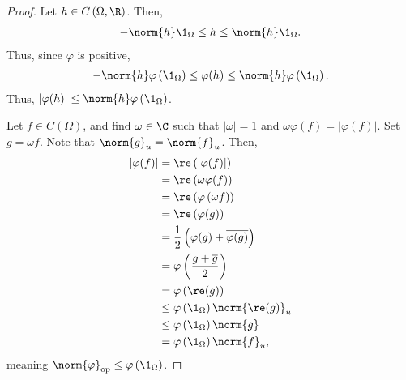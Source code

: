 \documentclass[10pt]{mypackage}
\begin{document}
\begin{proof}
  Let $h\in C\left(\Omega,\R\right)$. Then,
  \begin{align*}
    -\norm{h}\1_{\Omega}\leq h \leq \norm{h}\1_{\Omega}.
  \end{align*}
  Thus, since $\varphi$ is positive,
  \begin{align*}
    -\norm{h}\varphi\left(\1_{\Omega}\right) \leq \varphi(h) \leq \norm{h}\varphi\left(\1_{\Omega}\right).
  \end{align*}
  Thus, $\left\vert \varphi(h) \right\vert\leq \norm{h}\varphi\left(\1_{\Omega}\right)$.\newline

  Let $f\in C\left(\Omega\right)$, and find $\omega\in \C$ such that $\left\vert \omega \right\vert = 1$ and $\omega\varphi(f) = \left\vert \varphi(f) \right\vert$. Set $g = \omega f$. Note that $\norm{g}_{u} = \norm{f}_u$. Then,
  \begin{align*}
    \left\vert \varphi(f) \right\vert &= \re\left(\left\vert \varphi(f) \right\vert\right)\\
                                      &= \re\left(\omega\varphi(f)\right)\\
                                      &= \re\left(\varphi\left(\omega f\right)\right)\\
                                      &= \re\left(\varphi(g)\right)\\
                                      &= \frac{1}{2}\left(\varphi(g) + \overline{\varphi(g)}\right)\\
                                      &= \varphi\left(\frac{g + \overline{g}}{2}\right)\\
                                      &= \varphi\left(\re(g)\right)\\
                                      &\leq \varphi\left(\1_\Omega\right)\norm{\re(g)}_{u}\\
                                      &\leq \varphi\left(\1_\Omega\right)\norm{g}\\
                                      &= \varphi\left(\1_{\Omega}\right)\norm{f}_u,
  \end{align*}
  meaning $\norm{\varphi}_{\text{op}}\leq \varphi\left(\1_\Omega\right)$.\newline


\end{proof}
\end{document}
